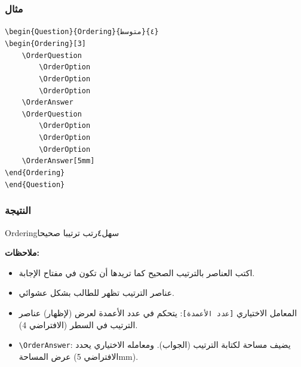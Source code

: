 \documentclass[a4paper]{article}
\newcommand{\engsf}[1]{\textenglish{\textsf{#1}}}
\newcommand{\engtt}[1]{\textenglish{\texttt{#1}}}
\begin{document}
\subsubsection*{مثال}

\begin{LTR}\ttfamily
\verb|\begin{Question}{Ordering}{متوسط}{٤}|\\
\verb|\begin{Ordering}[3]|\\
\verb|    \OrderQuestion|\\
\verb|        \OrderOption|\\
\verb|        \OrderOption|\\
\verb|        \OrderOption|\\
\verb|    \OrderAnswer|\\
\verb|    \OrderQuestion|\\
\verb|        \OrderOption|\\
\verb|        \OrderOption|\\
\verb|        \OrderOption|\\
\verb|    \OrderAnswer[5mm]|\\
\verb|\end{Ordering}|\\
\verb|\end{Question}|
\end{LTR}

\subsubsection*{النتيجة}

\begin{Question}{Ordering}{سهل}{٤}{رتب ترتيبا صحيحا}
\begin{Ordering}[3]
    \OrderAnswer
    \OrderAnswer[5mm]
\end{Ordering}
\end{Question}

\textbf{ملاحظات:}
\begin{itemize}
    \item اكتب العناصر بالترتيب الصحيح كما تريدها أن تكون في مفتاح الإجابة.
    \item عناصر الترتيب تظهر للطالب بشكل عشوائي.
    \item المعامل الاختياري \texttt{[عدد الأعمدة]}: يتحكم في عدد الأعمدة لعرض (لإظهار) عناصر الترتيب في السطر (الافتراضي 4).
    \item \engtt{\textbackslash OrderAnswer}: يضيف مساحة لكتابة الترتيب (الجواب). ومعامله الاختياري يحدد عرض المساحة (الافتراضي \engsf{5mm}).
\end{itemize}
\end{document}
